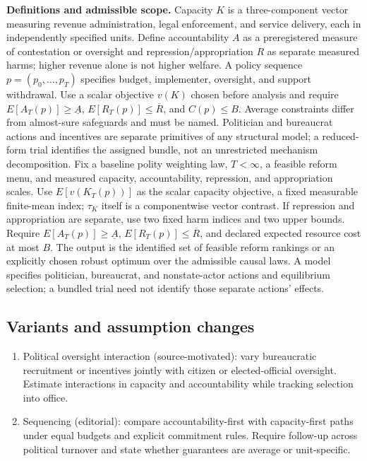 \documentclass[11pt,a4paper]{article}
\begin{document}
\textbf{Definitions and admissible scope.} Capacity \(K\) is a three-component vector measuring revenue administration, legal enforcement, and service delivery, each in independently specified units. Define accountability \(A\) as a preregistered measure of contestation or oversight and repression/appropriation \(R\) as separate measured harms; higher revenue alone is not higher welfare. A policy sequence \(p=(p_0,\ldots,p_T)\) specifies budget, implementer, oversight, and support withdrawal. Use a scalar objective \(v(K)\) chosen before analysis and require \(E[A_T(p)]\ge\underline A\), \(E[R_T(p)]\le\overline R\), and \(C(p)\le B\). Average constraints differ from almost-sure safeguards and must be named. Politician and bureaucrat actions and incentives are separate primitives of any structural model; a reduced-form trial identifies the assigned bundle, not an unrestricted mechanism decomposition. Fix a baseline polity weighting law, \(T<\infty\), a feasible reform menu, and measured capacity, accountability, repression, and appropriation scales. Use \(E[v(K_T(p))]\) as the scalar capacity objective, a fixed measurable finite-mean index; \(\tau_K\) itself is a componentwise vector contrast. If repression and appropriation are separate, use two fixed harm indices and two upper bounds. Require \(E[A_T(p)]\ge\underline A\), \(E[R_T(p)]\le\overline R\), and declared expected resource cost at most \(B\). The output is the identified set of feasible reform rankings or an explicitly chosen robust optimum over the admissible causal laws. A model specifies politician, bureaucrat, and nonstate-actor actions and equilibrium selection; a bundled trial need not identify those separate actions' effects.
\subsection*{Variants and assumption changes}
\begin{enumerate}
\item Political oversight interaction (source-motivated): vary bureaucratic recruitment or incentives jointly with citizen or elected-official oversight. Estimate interactions in capacity and accountability while tracking selection into office.
\item Sequencing (editorial): compare accountability-first with capacity-first paths under equal budgets and explicit commitment rules. Require follow-up across political turnover and state whether guarantees are average or unit-specific.
\end{enumerate}
\end{document}
